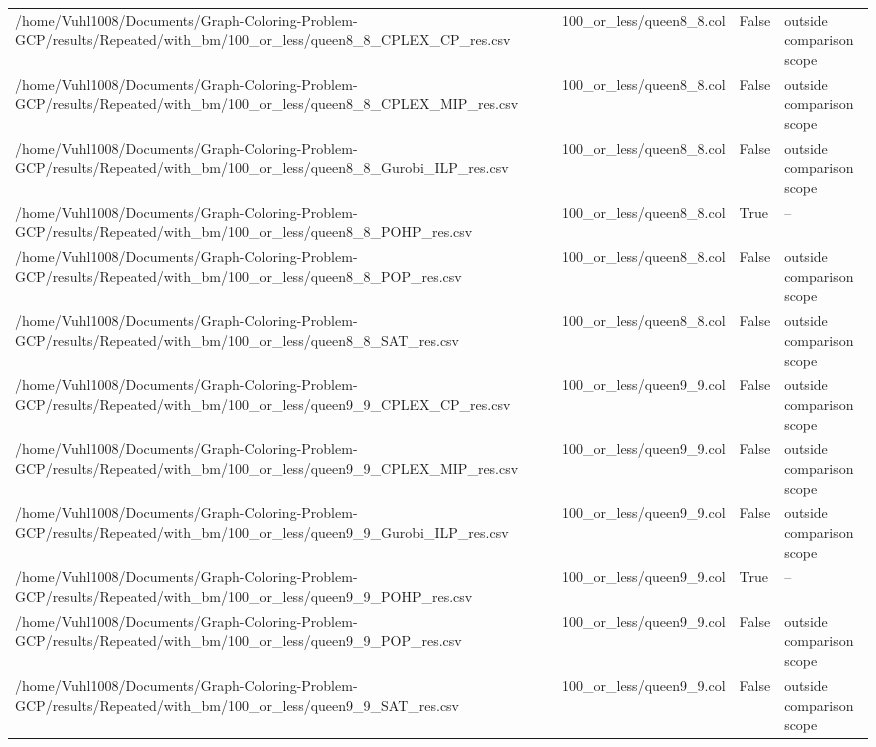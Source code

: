\begin{table}[htbp]
\begin{tabular}{llll}
/home/Vuhl1008/Documents/Graph-Coloring-Problem-GCP/results/Repeated/with\_bm/100\_or\_less/queen8\_8\_CPLEX\_CP\_res.csv & 100\_or\_less/queen8\_8.col & False & outside comparison scope \\
/home/Vuhl1008/Documents/Graph-Coloring-Problem-GCP/results/Repeated/with\_bm/100\_or\_less/queen8\_8\_CPLEX\_MIP\_res.csv & 100\_or\_less/queen8\_8.col & False & outside comparison scope \\
/home/Vuhl1008/Documents/Graph-Coloring-Problem-GCP/results/Repeated/with\_bm/100\_or\_less/queen8\_8\_Gurobi\_ILP\_res.csv & 100\_or\_less/queen8\_8.col & False & outside comparison scope \\
/home/Vuhl1008/Documents/Graph-Coloring-Problem-GCP/results/Repeated/with\_bm/100\_or\_less/queen8\_8\_POHP\_res.csv & 100\_or\_less/queen8\_8.col & True & -- \\
/home/Vuhl1008/Documents/Graph-Coloring-Problem-GCP/results/Repeated/with\_bm/100\_or\_less/queen8\_8\_POP\_res.csv & 100\_or\_less/queen8\_8.col & False & outside comparison scope \\
/home/Vuhl1008/Documents/Graph-Coloring-Problem-GCP/results/Repeated/with\_bm/100\_or\_less/queen8\_8\_SAT\_res.csv & 100\_or\_less/queen8\_8.col & False & outside comparison scope \\
/home/Vuhl1008/Documents/Graph-Coloring-Problem-GCP/results/Repeated/with\_bm/100\_or\_less/queen9\_9\_CPLEX\_CP\_res.csv & 100\_or\_less/queen9\_9.col & False & outside comparison scope \\
/home/Vuhl1008/Documents/Graph-Coloring-Problem-GCP/results/Repeated/with\_bm/100\_or\_less/queen9\_9\_CPLEX\_MIP\_res.csv & 100\_or\_less/queen9\_9.col & False & outside comparison scope \\
/home/Vuhl1008/Documents/Graph-Coloring-Problem-GCP/results/Repeated/with\_bm/100\_or\_less/queen9\_9\_Gurobi\_ILP\_res.csv & 100\_or\_less/queen9\_9.col & False & outside comparison scope \\
/home/Vuhl1008/Documents/Graph-Coloring-Problem-GCP/results/Repeated/with\_bm/100\_or\_less/queen9\_9\_POHP\_res.csv & 100\_or\_less/queen9\_9.col & True & -- \\
/home/Vuhl1008/Documents/Graph-Coloring-Problem-GCP/results/Repeated/with\_bm/100\_or\_less/queen9\_9\_POP\_res.csv & 100\_or\_less/queen9\_9.col & False & outside comparison scope \\
/home/Vuhl1008/Documents/Graph-Coloring-Problem-GCP/results/Repeated/with\_bm/100\_or\_less/queen9\_9\_SAT\_res.csv & 100\_or\_less/queen9\_9.col & False & outside comparison scope \\

\end{tabular}
\end{table}
